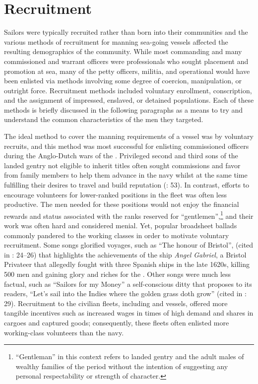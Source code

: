 \section{{Recruitment}}\label{sec:3.2}

  Sailors were typically recruited rather than born into their communities and the various methods of recruitment for manning sea-going vessels affected the resulting demographics of the community. While most commanding and many commissioned and warrant officers were professionals who sought placement and promotion at sea, many of the petty officers, militia, and operational  would have been enlisted via methods involving some degree of coercion, manipulation, or outright force. Recruitment methods included voluntary enrollment, conscription, and the assignment of impressed, enslaved, or detained populations. Each of these methods is briefly discussed in the following paragraphs as a means to try and understand the common characteristics of the men they targeted. 

  The ideal method to cover the manning requirements of a vessel was by voluntary recruits, and this method was most successful for enlisting commissioned officers during the Anglo-Dutch wars of the . Privileged second and third sons of the landed gentry not eligible to inherit titles often sought commissions and favor from family members to help them advance in the navy whilst at the same time fulfilling their desires to travel and build reputation (\citealt{Brown2011}: 53). In contrast, efforts to encourage volunteers for lower-ranked positions in the fleet was often less productive. The men needed for these positions would not enjoy the financial rewards and status associated with the ranks reserved for “gentlemen”,\footnote{“Gentleman” in this context refers to landed gentry and the adult males of wealthy families of the period without the intention of suggesting any personal respectability or strength of character.}  and their work was often hard and considered menial. Yet, popular broadsheet ballads commonly pandered to the working classes in order to motivate voluntary recruitment. Some songs glorified voyages, such as “The honour of Bristol”, (cited in \citealt{Palmer1986}: 24–26) that highlights the achievements of the ship \textit{Angel Gabriel}, a Bristol Privateer that allegedly fought with three Spanish ships in the late 1620s, killing 500 men and gaining glory and riches for the . Other songs were much less factual, such as “Sailors for my Money” a self-conscious ditty that proposes to its readers, “Let’s sail into the Indies where the golden grass doth grow” (cited in \citealt{Palmer1986}: 29). Recruitment to the civilian fleets, including  and  vessels, offered more tangible incentives such as increased wages in times of high demand and shares in cargoes and captured goods; consequently, these fleets often enlisted more working-class volunteers than the navy. 

